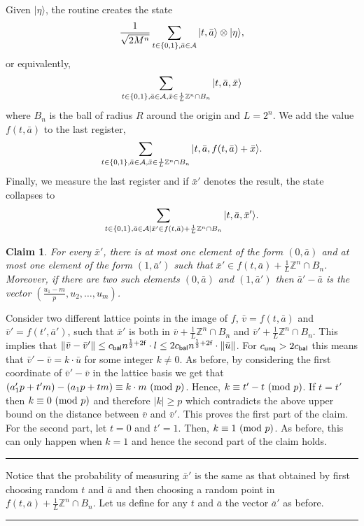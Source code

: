 \documentclass[11pt]{article}
\newtheorem{claim}[theorem]{Claim}
\newcommand{\qedsymb}{\hfill{\rule{2mm}{2mm}}}
\newenvironment{proof}{\begin{trivlist}
\item[\hspace{\labelsep}{\sl\noindent Proof:\/}]
}{\qedsymb\end{trivlist}}
\def\Z{\mathbb{Z}}
\def\mod{{\rm mod}}
\newcommand\ket[1]{{ |{#1} \rangle }}
\newcommand\C[1]{{ c_{\sf {#1}} }}
\begin{document}
\begin{proof}
Given $\ket{\eta}$, the routine creates the state
 $$ \frac{1}{\sqrt{2M^n}}\sum_{t\in \{0,1\}, \bar{a} \in {\cal A}} \ket{t,\bar{a}} \otimes \ket{\eta},$$
or equivalently,
 $$ \sum_{t\in \{0,1\}, \bar{a} \in {\cal A}, \bar{x} \in \frac{1}{L}\Z^n \cap B_n} \ket{t,\bar{a},\bar{x}} $$
where $B_n$ is the ball of radius $R$ around the origin and $L=2^n$. We add the value $f(t,\bar{a})$ to the last
register,
 $$ \sum_{t\in \{0,1\}, \bar{a} \in {\cal A}, \bar{x} \in \frac{1}{L}\Z^n \cap B_n} \ket{t,\bar{a},f(t,\bar{a})+\bar{x}}. $$
Finally, we measure the last register and if $\bar{x}'$ denotes the result, the state collapses to
 $$ \sum_{t\in \{0,1\}, \bar{a} \in {\cal A} | \bar{x}' \in f(t,\bar{a})+\frac{1}{L}\Z^n \cap B_n}
     \ket{t,\bar{a},\bar{x}'}. $$

\begin{claim}
For every $\bar{x}'$, there is at most one element of the form $(0,\bar{a})$ and at most one element of the form
$(1,\bar{a}')$ such that $\bar{x}' \in f(t,\bar{a})+\frac{1}{L}\Z^n \cap B_n$. Moreover, if there are two such elements
$(0,\bar{a})$ and $(1,\bar{a}')$ then $\bar{a}'-\bar{a}$ is the vector $(\frac{u_1-m}{p},u_2,\ldots,u_m)$.
\end{claim}
\begin{proof}
Consider two different lattice points in the image of $f$, $\bar{v}=f(t,\bar{a})$ and $\bar{v}'=f(t',\bar{a}')$, such
that $\bar{x}'$ is both in $\bar{v}+\frac{1}{L}\Z^n \cap B_n$ and $\bar{v}'+\frac{1}{L}\Z^n \cap B_n$. This implies
that $\|\bar{v}-\bar{v}'\| \le \C{bal}n^{\frac{1}{2}+2{\sf f}}\cdot l \le 2\C{bal}n^{\frac{1}{2}+2{\sf f}}\cdot
\|\bar{u}\|$. For $\C{unq} > 2\C{bal}$ this means that $\bar{v}'-\bar{v}=k \cdot \bar{u}$ for some integer $k\neq 0$.
As before, by considering the first coordinate of $\bar{v}'-\bar{v}$ in the lattice basis we get that $(a'_1 p +
t'm)-(a_1 p + tm) \equiv k\cdot m~(\mod~p)$. Hence, $k \equiv t'-t~(\mod~p)$. If $t=t'$ then $k\equiv 0~(\mod~p)$ and
therefore $|k| \ge p$ which contradicts the above upper bound on the distance between $\bar{v}$ and $\bar{v}'$. This
proves the first part of the claim. For the second part, let $t=0$ and $t'=1$. Then, $k \equiv 1~(\mod~p)$. As before,
this can only happen when $k=1$ and hence the second part of the claim holds.
\end{proof}

Notice that the probability of measuring $\bar{x}'$ is the same as that obtained by first choosing random $t$ and
$\bar{a}$ and then choosing a random point in $f(t,\bar{a})+\frac{1}{L}\Z^n \cap B_n$. Let us define for any $t$ and
$\bar{a}$ the vector $\bar{a}'$ as before.


\end{proof}
\end{document}
